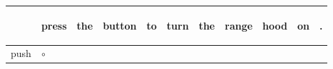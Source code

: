 \documentclass[landscape]{article}
\newcommand{\ssp}{\hspace{2pt}}
\newcommand{\map}{\cellcolor{y}$\boldsymbol\circ$}
\begin{document}
\newpage

\noindent\begin{tabular}{|l|p{10pt}|p{10pt}|p{10pt}|p{10pt}|p{10pt}|p{10pt}|p{10pt}|p{10pt}|p{10pt}|p{10pt}|}
\hline
&\begin{sideways}\cellcolor{ref0}press\hspace{12pt}\end{sideways}&\begin{sideways}\cellcolor{ref1}the\hspace{12pt}\end{sideways}&\begin{sideways}\cellcolor{ref2}button\hspace{12pt}\end{sideways}&\begin{sideways}\cellcolor{ref3}to\hspace{12pt}\end{sideways}&\begin{sideways}\cellcolor{ref4}turn\hspace{12pt}\end{sideways}&\begin{sideways}\cellcolor{ref5}the\hspace{12pt}\end{sideways}&\begin{sideways}\cellcolor{ref6}range\hspace{12pt}\end{sideways}&\begin{sideways}\cellcolor{ref7}hood\hspace{12pt}\end{sideways}&\begin{sideways}\cellcolor{ref8}on\hspace{12pt}\end{sideways}&\begin{sideways}\cellcolor{ref9}.\hspace{12pt}\end{sideways}\\
\hline
\ssp \cellcolor{ref0}push \ssp&\hspace{2pt}\map&\hspace{2pt}&\hspace{2pt}&\hspace{2pt}&\hspace{2pt}&\hspace{2pt}&\hspace{2pt}&\hspace{2pt}&\hspace{2pt}&\hspace{2pt}\\

\end{tabular}
\end{document}
